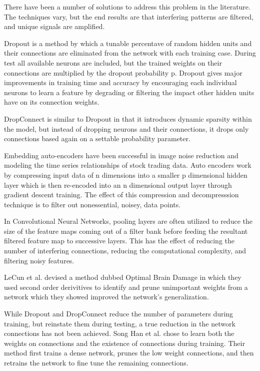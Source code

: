 \documentclass{llncs}
\begin{document}
There have been a number of solutions to address this problem in the literature.  The techniques vary, but the end results are that interfering patterns are filtered, and unique signals are amplified.

Dropout is a method by which a tunable percentave of random hidden units and their connections are eliminated from the network with each training case.  During test all available neurons are included, but the trained weights on their connections are multiplied by the dropout probability p.  Dropout gives major improvements in training time and accuracy by encouraging each individual neurons to learn a feature by degrading or filtering the impact other hidden units have on its connection weights.

DropConnect is similar to Dropout in that it introduces dynamic sparsity within the model, but instead of dropping neurons and their connections, it drops only connections based again on a settable probability parameter.

Embedding auto-encoders have been successful in image noise reduction and modeling the time series relationships of stock trading data.  Auto encoders work by compressing input data of n dimensions into a smaller p dimensional hidden layer which is then re-encoded into an n dimensional output layer through gradient descent training.  The effect of this compression and decompresssion technique is to filter out nonessential, noisey, data points.

In Convolutional Neural Networks,  pooling layers are often utilized to reduce the size of the feature maps coming out of a filter bank before feeding the resultant filtered feature map to successive layers.  This has the effect of reducing the number of interfering connections, reducing the computational complexity, and filtering noisy features.

LeCun et al. devised a method dubbed Optimal Brain Damage in which they used second order derivitives to identify and prune unimportant weights from a network which they showed improved the network's generalization.

While Dropout and DropConnect reduce the number of parameters during training, but reinstate them during testing, a true reduction in the network connections has not been achieved.   Song Han et al. chose to learn both the weights on connections and the existence of connections during training. Their method first trains a dense network, prunes the low weight connections, and then retrains the network to fine tune the remaining connections.
\end{document}
